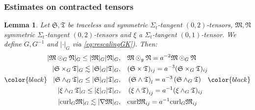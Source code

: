\documentclass[11pt,leqno,textwidth=10cm]{amsart}
\numberwithin{equation}{section}
\theoremstyle{definition}
\theoremstyle{plain}
\newtheorem{lemma}[definition]{Lemma}
\newcommand{\1}{\mathbbm{1}}
\newcommand{\curl}{\text{\normalfont{curl}}}
\newcommand{\change}[1]{\color{black}#1\color{black}}
\begin{document}
\subsubsection{Estimates on contracted tensors}\label{subsubsec:basic-est}

\begin{lemma}\label{lem:BelRobinsonLemmas}
Let $\mathfrak{S},\mathfrak{T}$ be traceless and symmetric $\Sigma_t$-tangent $(0,2)$-tensors, $\mathfrak{M},\mathfrak{N}$ symmetric $\Sigma_t$-tangent $(0,2)$-tensors and $\xi$ a $\Sigma_t$-tangent $(0,1)$-tensor. We define $G, G^{-1}$ and $\lvert\cdot\rvert_G$ via \eqref{eq:rescalingGK}). Then:
\begin{subequations}
\change{\begin{align}
\lvert \mathfrak{M}\odot_G\mathfrak{N}\rvert_G\leq\lvert \mathfrak{M}\rvert_G\lvert \mathfrak{N}\rvert_G,&\quad \mathfrak{M}\odot_g\mathfrak{N}= a^{-2}\mathfrak{M}\odot_G\mathfrak{N}\label{eq:odot}\\
\lvert \mathfrak{S}\times_G \mathfrak{T}\rvert_G\lesssim\lvert \mathfrak{S}\rvert_G\lvert \mathfrak{T}\rvert_G,&\quad (\mathfrak{S}\times \mathfrak{T})_{ij}=a^{-3}(\mathfrak{S}\times_G \mathfrak{T})_{ij}\label{eq:times}\\
\lvert \mathfrak{S}\wedge_G \mathfrak{T}\rvert_G\leq \lvert \mathfrak{S}\rvert_G\lvert \mathfrak{T}\rvert_G,&\quad \left(\mathfrak{S}\wedge \mathfrak{T}\right)_l= a^{-3}\left(\mathfrak{S}\wedge_G \mathfrak{T}\right)\label{eq:wedge}\\
\lvert \xi\wedge_G \mathfrak{T}\rvert_G\leq\lvert \xi\rvert_G\lvert \mathfrak{T}\rvert_G,&\quad \left(\xi\wedge\mathfrak{T}\right)_{ij}= a^{-1}(\xi\wedge_G\mathfrak{T})_{ij}\label{eq:wedge2}\\
\lvert\curl_G\mathfrak{M}\rvert_G\lesssim \lvert\nabla \mathfrak{M}\rvert_G,&\quad \curl \mathfrak{M}_{ij}= a^{-1}\curl_G\mathfrak{M}_{ij}\label{eq:curl}
\end{align}}
\end{subequations}
\end{lemma}
\end{document}
